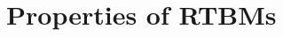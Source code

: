 \documentclass[10pt]{beamer}
\begin{document}
        
       

\section{Properties of RTBMs}
\end{document}
